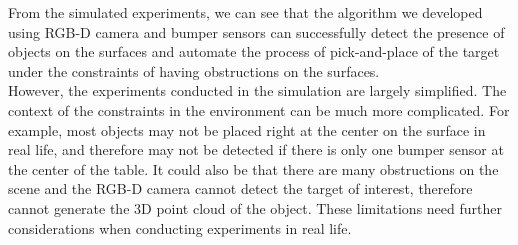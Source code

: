 From the simulated experiments, we can see that the algorithm we developed using RGB-D camera and bumper sensors can successfully detect the presence of objects on the surfaces and automate the process of pick-and-place of the target under the constraints of having obstructions on the surfaces. \\

However, the experiments conducted in the simulation are largely simplified. The context of the constraints in the environment can be much more complicated. For example, most objects may not be placed right at the center on the surface in real life, and therefore may not be detected if there is only one bumper sensor at the center of the table. It could also be that there are many obstructions on the scene and the RGB-D camera cannot detect the target of interest, therefore cannot generate the 3D point cloud of the object. These limitations need further considerations when conducting experiments in real life.